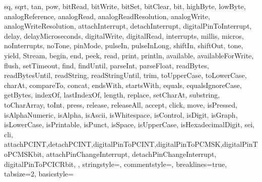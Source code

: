 {{                sq, sqrt, tan, pow, bitRead, bitWrite, bitSet, bitClear, bit, 
                highByte, lowByte, analogReference, analogRead, 
                analogReadResolution, analogWrite, analogWriteResolution, 
                attachInterrupt, detachInterrupt, digitalPinToInterrupt, delay, 
                delayMicroseconds, digitalWrite, digitalRead, interrupts, millis, 
                micros, noInterrupts, noTone, pinMode, pulseIn, pulseInLong, shiftIn, 
                shiftOut, tone, yield, Stream, begin, end, peek, read, print, 
                println, available, availableForWrite, flush, setTimeout, find, 
                findUntil, parseInt, parseFloat, readBytes, readBytesUntil, readString, 
                readStringUntil, trim, toUpperCase, toLowerCase, charAt, compareTo, 
                concat, endsWith, startsWith, equals, equalsIgnoreCase, getBytes, 
                indexOf, lastIndexOf, length, replace, setCharAt, substring, 
                toCharArray, toInt, press, release, releaseAll, accept, click, move, 
                isPressed, isAlphaNumeric, isAlpha, isAscii, isWhitespace, isControl, 
                isDigit, isGraph, isLowerCase, isPrintable, isPunct, isSpace, 
                isUpperCase, isHexadecimalDigit, sei, cli,
                attachPCINT,detachPCINT,digitalPinToPCINT,digitalPinToPCMSK,digitalPinToPCMSKbit,
                attachPinChangeInterrupt, detachPinChangeInterrupt,
                digitalPinToPCICRbit,
                },      
%
%
  stringstyle=\color{arduinoDarkBlue},    
  commentstyle=\color{arduinoGrey},    
%          
%   
%
%
  breaklines=true,                    %
  tabsize=2,         
  basicstyle=\ttfamily  
}
